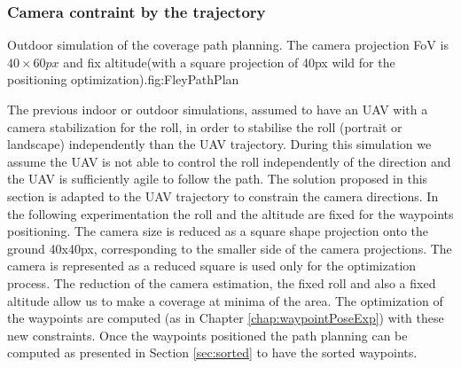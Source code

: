  \subsubsection{Camera contraint by the trajectory} \label{sec:holonomie path}
  \begin{mfigures}[!]{Outdoor simulation of the coverage path planning. The camera projection FoV is $40 \times 60 px$  and fix altitude(with  a square projection of 40px wild for the positioning optimization).}{fig:FleyPathPlan} \centering
\hspace{1cm}
\tabsimuposeFleyPathHolonom
\end{mfigures} 

The previous indoor or outdoor simulations, assumed to have an UAV with a camera stabilization for the roll, in order to stabilise the roll (portrait or landscape) independently than the UAV trajectory.
During this simulation we assume the UAV is not able to control the roll independently of the direction and the UAV is sufficiently agile to follow the path.
The solution proposed in this section is adapted to the UAV trajectory to constrain the camera directions. 
In the following experimentation the roll and the altitude are fixed for the waypoints positioning. The camera size is reduced as a square shape projection onto the ground 40x40px, corresponding to the smaller side of the camera projections. The camera is represented as a reduced square is used only for the optimization process.
 The reduction of the camera estimation, the fixed roll and also a fixed altitude allow us to make a coverage at minima of the area.
The optimization of the waypoints are computed (as in Chapter \ref{chap:waypointPoseExp}) with these new constraints. Once the waypoints positioned  
the path planning can be computed as presented in Section \ref{sec:sorted} to have the sorted waypoints.


